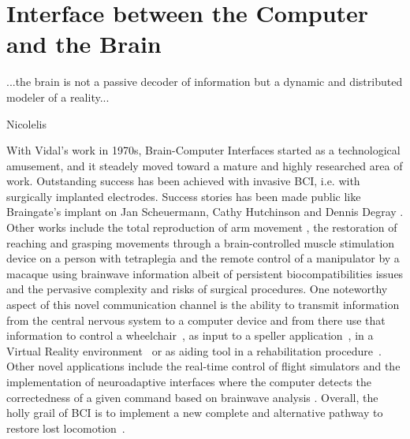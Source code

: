 \chapter{Interface between the Computer and the Brain}
\label{chapter:one}

\epigraph{...the brain is not a passive decoder of information but a dynamic and distributed modeler of a reality...}{Nicolelis}


\vspace{10px}




With Vidal's work in 1970s, Brain-Computer Interfaces started as a technological amusement, and it steadely moved toward a mature and highly researched area of work.  Outstanding success has been achieved with invasive BCI, i.e. with surgically implanted electrodes. Success stories has been made public like Braingate's implant on Jan Scheuermann, Cathy Hutchinson and Dennis Degray \cite{Pandarinath2017}.  Other works include the total reproduction of arm movement \cite{c27}, the restoration of reaching and grasping movements through a brain-controlled muscle stimulation device on a person with tetraplegia \cite{Ajiboye2017} and the remote control of a manipulator by a macaque using brainwave information \cite{c29} albeit of persistent biocompatibilities issues and the pervasive complexity and risks of surgical procedures. One noteworthy aspect of this novel communication channel is the ability to transmit information from the central nervous system to a computer device and from there use that information to control a wheelchair~\cite{Carlson2013}, as input to a speller application~\cite{Guger2009a}, in a Virtual Reality environment~\cite{Lotte2013} or as aiding tool in a rehabilitation procedure~\cite{Jure2016}.  Other novel applications include the real-time control of flight simulators \cite{Nourmohammadi2018} and the implementation of neuroadaptive interfaces where the computer detects the correctedness of a given command based on brainwave analysis \cite{Zander2016}.  Overall, the holly grail of BCI is to implement a new complete and alternative pathway to restore lost locomotion~\cite{WolpawJonathanR2012}.

